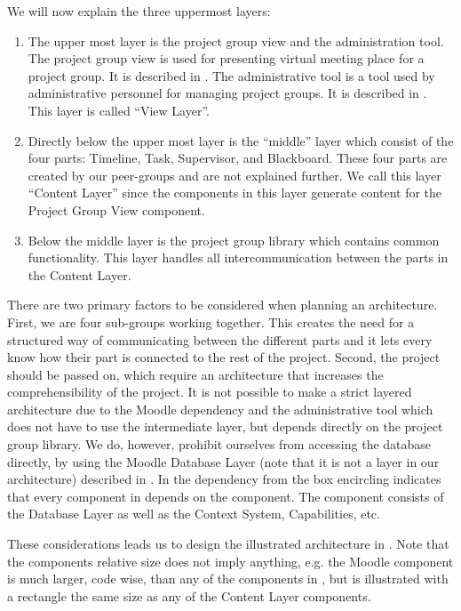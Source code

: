 We will now explain the three uppermost layers:
\begin{enumerate}
	\item The upper most layer is the project group view and the administration tool.
	The project group view is used for presenting virtual meeting place for a project group.
	It is described in .
	The administrative tool is a tool used by administrative personnel for managing project groups.
	It is described in .
	This layer is called ``View Layer''.
	\item Directly below the upper most layer is the ``middle'' layer which consist of the four parts: Timeline, Task, Supervisor, and Blackboard.
	These four parts are created by our peer-groups and are not explained further.
	We call this layer ``Content Layer'' since the components in this layer generate content for the Project Group View component.
	\item Below the middle layer is the project group library which contains common functionality.
	This layer handles all intercommunication between the parts in the Content Layer.  
\end{enumerate}


There are two primary factors to be considered when planning an architecture. 
First, we are four sub-groups working together. 
This creates the need for a structured way of communicating between the different parts and it lets every \subgroup{} know how their part is connected to the rest of the project. 
Second, the project should be passed on, which require an architecture that increases the comprehensibility of the project.
It is not possible to make a strict layered architecture due to the Moodle dependency and the administrative tool which does not have to use the intermediate layer, but depends directly on the project group library.
We do, however, prohibit ourselves from accessing the database directly, by using the Moodle Database Layer (note that it is not a layer in our architecture) described in .
In  the dependency from the box encircling \system{} indicates that every component in \system{} depends on the \moodle{} component.
The \moolde{} component consists of the Database Layer as well as the Context System, Capabilities, etc.

These considerations leads us to design the illustrated architecture in .
Note that the components relative size does not imply anything, e.g. the Moodle component is much larger, code wise, than any of the components in \system{}, but is illustrated with a rectangle the same size as any of the Content Layer components.













